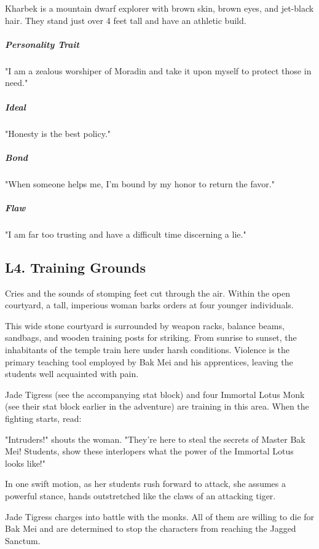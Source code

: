 \documentclass[10pt,a4paper,twoside,bg=print,twocolumn,openany,nodeprecatedcode]{dndbook}
\begin{document}
Kharbek is a mountain dwarf explorer with brown skin, brown eyes, and jet-black hair. They stand just over 4 feet tall and have an athletic build.

\subparagraph{Personality Trait}
"I am a zealous worshiper of Moradin and take it upon myself to protect those in need."

\subparagraph{Ideal}
"Honesty is the best policy."

\subparagraph{Bond}
"When someone helps me, I'm bound by my honor to return the favor."

\subparagraph{Flaw}
"I am far too trusting and have a difficult time discerning a lie."

\subsection{L4. Training Grounds}
\begin{DndReadAloud}{}
Cries and the sounds of stomping feet cut through the air. Within the open courtyard, a tall, imperious woman barks orders at four younger individuals.

\end{DndReadAloud}

This wide stone courtyard is surrounded by weapon racks, balance beams, sandbags, and wooden training posts for striking. From sunrise to sunset, the inhabitants of the temple train here under harsh conditions. Violence is the primary teaching tool employed by Bak Mei and his apprentices, leaving the students well acquainted with pain.

Jade Tigress (see the accompanying stat block) and four Immortal Lotus Monk (see their stat block earlier in the adventure) are training in this area. When the fighting starts, read:

\begin{DndReadAloud}{}
"Intruders!" shouts the woman. "They're here to steal the secrets of Master Bak Mei! Students, show these interlopers what the power of the Immortal Lotus looks like!"

In one swift motion, as her students rush forward to attack, she assumes a powerful stance, hands outstretched like the claws of an attacking tiger.

\end{DndReadAloud}

Jade Tigress charges into battle with the monks. All of them are willing to die for Bak Mei and are determined to stop the characters from reaching the Jagged Sanctum.
\end{document}
